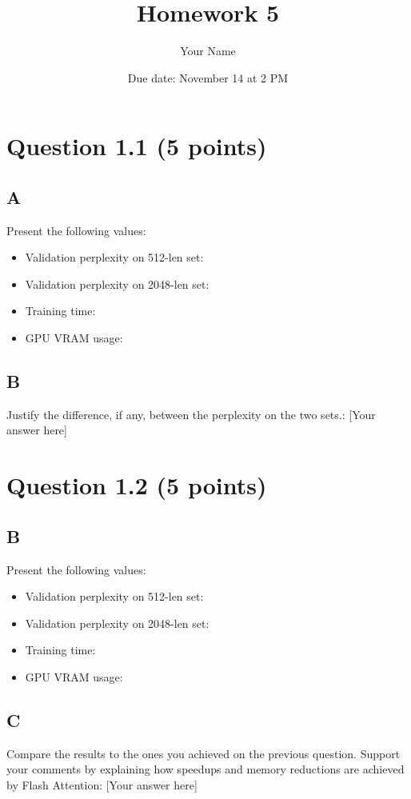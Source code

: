\documentclass{article}
\title{Homework 5}
\author{Your Name}
\date{Due date: November 14 at 2 PM}
\begin{document}
\maketitle

\section*{Question 1.1 (5 points)}

\subsection*{A}
Present the following values:
\begin{itemize}
    \item Validation perplexity on 512-len set:
    \item Validation perplexity on 2048-len set:
    \item Training time:
    \item GPU VRAM usage:
\end{itemize}

\subsection*{B}
Justify the difference, if any, between the perplexity on the two sets.: [Your answer here]

\section*{Question 1.2 (5 points)}

\subsection*{B}
Present the following values:
\begin{itemize}
    \item Validation perplexity on 512-len set:
    \item Validation perplexity on 2048-len set:
    \item Training time:
    \item GPU VRAM usage:
\end{itemize}

\subsection*{C}
Compare the results to the ones you achieved on the previous question. Support your comments by
explaining how speedups and memory reductions are achieved by Flash Attention: [Your answer here]
\end{document}
